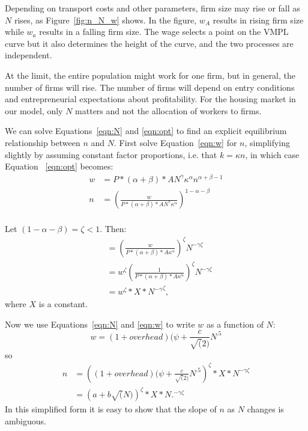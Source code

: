 {Depending on transport costs and other parameters, firm size may rise or fall as $N$ rises, as Figure~\ref{fig:n_N_w} shows. In the figure, $w_A$ results in rising firm size while $w_a$ results in a falling firm size. The wage selects a point on the VMPL curve but it also determines the  height of the curve, and the two processes are independent.}

At the limit, the entire population might work for one firm, but in general, the number of firms will rise. The number of firms will depend on entry conditions and entrepreneurial expectations about profitability. For the housing market in our model, only $N$ matters and not the allocation of workers to firms.%

We can solve Equations~\ref{eqn:N} and \ref{eqn:opt} to find an explicit equilibrium relationship between $n$ and $N$. First solve Equation~\ref{eqn:w} for $n$, simplifying slightly by assuming constant factor proportions, i.e. that  $k=\kappa n$, in which case Equation~ \ref{eqn:opt} becomes: 
\begin{align}\label{eqn:opt1}
w   &= P*(\alpha+\beta)*AN^\gamma \kappa^\alpha n^{\alpha+\beta-1} \\   
n  &=\left(\frac{w}{P*(\alpha+\beta)*AN^\gamma \kappa^\alpha}\right)^{1-\alpha-\beta} \\
\end{align}

Let $(1-\alpha-\beta) = \zeta <1.$ Then:
\begin{align}
    &=\left(\frac{w}{P*(\alpha+\beta)*A \kappa^\alpha}\right)^\zeta N^{-\gamma\zeta }\\
    &=w^\zeta\left(\frac{1}{P*(\alpha+\beta)*A \kappa^\alpha}\right)^\zeta N^{-\gamma\zeta }\\
    &=w^\zeta*X*{N^{-\gamma}}^\zeta,
\end{align}
where $X$ is a constant.

Now we use Equations~\ref{eqn:N} and \ref{eqn:w} to write $w$ as a function of $N$:
\[w=(1+overhead)(\psi+\frac{c}{\sqrt(2)}N^{.5}\]
so
\begin{align}
    n &= \left((1+overhead)(\psi+\frac{c}{\sqrt(2)}N^{.5}\right)^\zeta*X*N^{-\gamma\zeta }\\
  &= \left(a+b\sqrt(N)\right)^\zeta*X*N.^{-\gamma\zeta }   
\end{align}
In this simplified form it is easy to show that the slope of $n$ as $N$ changes is ambiguous. %

